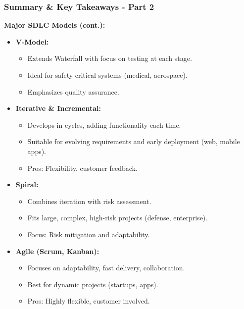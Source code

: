 \documentclass{beamer}
\begin{document}
\begin{frame}[fragile]
    \frametitle{Summary & Key Takeaways - Part 2}
    \textbf{Major SDLC Models (cont.):}
    \begin{itemize}
        \item \textbf{V-Model:}
        \begin{itemize}
            \item Extends Waterfall with focus on testing at each stage.
            \item Ideal for safety-critical systems (medical, aerospace).
            \item Emphasizes quality assurance.
        \end{itemize}
        \item \textbf{Iterative \& Incremental:}
        \begin{itemize}
            \item Develops in cycles, adding functionality each time.
            \item Suitable for evolving requirements and early deployment (web, mobile apps).
            \item Pros: Flexibility, customer feedback.
        \end{itemize}
        \item \textbf{Spiral:}
        \begin{itemize}
            \item Combines iteration with risk assessment.
            \item Fits large, complex, high-risk projects (defense, enterprise).
            \item Focus: Risk mitigation and adaptability.
        \end{itemize}
        \item \textbf{Agile (Scrum, Kanban):}
        \begin{itemize}
            \item Focuses on adaptability, fast delivery, collaboration.
            \item Best for dynamic projects (startups, apps).
            \item Pros: Highly flexible, customer involved.
        \end{itemize}
    \end{itemize}
\end{frame}
\end{document}
